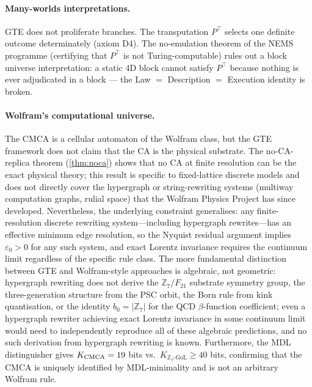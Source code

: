 \documentclass[11pt]{article}
\theoremstyle{remark}
\newcommand{\ZS}{\mathbb{Z}_7}
\begin{document}
\paragraph{Many-worlds interpretations.}
GTE does not proliferate branches.  The transputation $P^\top$ selects one
definite outcome determinately (axiom D4).  The no-emulation theorem
of the NEMS programme (certifying that $P^\top$ is not Turing-computable)
rules out a block universe interpretation: a static 4D block cannot satisfy
$P^\top$ because nothing is ever adjudicated in a block --- the
Law $=$ Description $=$ Execution identity is broken.

\paragraph{Wolfram's computational universe.}
The CMCA is a cellular automaton of the Wolfram class, but the GTE framework
does not claim that the CA is the physical substrate.  The no-CA-replica
theorem (\cref{thm:noca}) shows that no CA at finite resolution can be the
exact physical theory; this result is specific to fixed-lattice discrete models and
does not directly cover the hypergraph or string-rewriting systems
(multiway computation graphs, rulial space) that the Wolfram Physics Project has
since developed.  Nevertheless, the underlying constraint generalises: any
finite-resolution discrete rewriting system---including hypergraph rewrites---has an
effective minimum edge resolution, so the Nyquist residual argument implies
$\varepsilon_0 > 0$ for any such system, and exact Lorentz invariance requires the
continuum limit regardless of the specific rule class.
The more fundamental distinction between GTE and Wolfram-style approaches is
algebraic, not geometric: hypergraph rewriting does not derive the $\ZS/F_{21}$
substrate symmetry group, the three-generation structure from the PSC orbit, the
Born rule from kink quantisation, or the identity $b_0 = |\ZS|$ for the QCD
$\beta$-function coefficient; even a hypergraph rewriter achieving exact Lorentz
invariance in some continuum limit would need to independently reproduce all of these
algebraic predictions, and no such derivation from hypergraph rewriting is known.
Furthermore, the MDL distinguisher gives
$K_{\rm CMCA} = 19$ bits vs.\ $K_{\ZS\text{-GoL}} \geq 40$ bits, confirming
that the CMCA is uniquely identified by MDL-minimality and is not
an arbitrary Wolfram rule.
\end{document}
